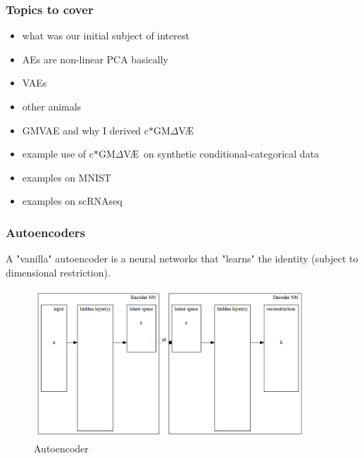 \documentclass[final]{beamer}
\theoremstyle{plain}
\theoremstyle{definition}
\theoremstyle{remark}
\newcommand{\gmvae}{c$\ast$GM$\Delta$V\AE~}
\begin{document}
\begin{frame}
\frametitle{Topics to cover}
\begin{itemize}
\item{} what was our initial subject of interest
\item{} AEs are non-linear PCA basically
\item{} VAEs
\item{} other animals
\item{} GMVAE and why I derived \gmvae
\item{} example use of \gmvae on synthetic conditional-categorical data
\item{} examples on MNIST
\item{} examples on scRNAseq
\end{itemize}
\end{frame}

\begin{frame}
\frametitle{Autoencoders}
A "vanilla" autoencoder is a neural networks that "learns" the identity (subject
to dimensional restriction).

\begin{figure}[h]
\centering
\includegraphics[width=0.9\textwidth]{./plots/autoencoderNN.gv.png}
\caption{Autoencoder}
\label{fig:autoencoder}
\end{figure}

\end{frame}
\end{document}
